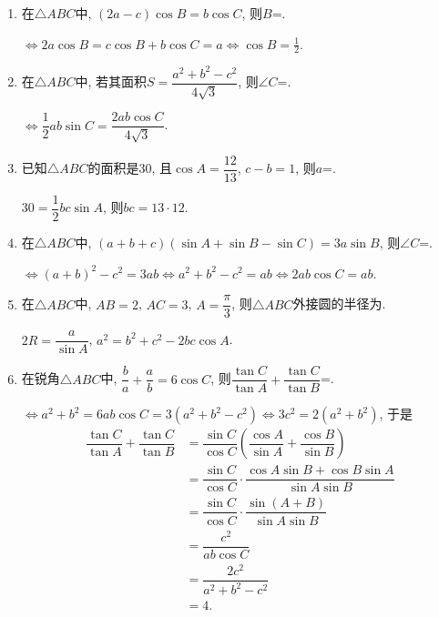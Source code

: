 \begin{enumerate}
\item 在$\triangle{ABC}$中, $(2a-c)\cos{B}=b\cos{C}$, 则$B$=. 
\begin{jieda}
$\iff 2a\cos{B}=c\cos{B}+b\cos{C}=a\iff\cos{B}=\frac{1}{2}$. 
\end{jieda}

\item 在$\triangle{ABC}$中, 若其面积$S=\dfrac{a^2+b^2-c^2}{4\sqrt 3}$, 则$\angle{C}$=. 
\begin{jieda}
$\iff \dfrac{1}{2}ab\sin{C}=\dfrac{2ab\cos{C}}{4\sqrt{3}}$. 
\end{jieda}

\item 已知$\triangle{ABC}$的面积是30, 且$\cos{A}=\dfrac{12}{13}$, $c-b=1$, 则$a$=. 
\begin{jieda}
$30=\dfrac{1}{2}bc\sin{A}$, 则$bc=13\cdot 12$. 
\end{jieda}

\item 在$\triangle{ABC}$中, $(a+b+c)(\sin{A}+\sin{B}-\sin{C})=3a\sin{B}$, 则$\angle{C}$=. 
\begin{jieda}
$\iff(a+b)^2-c^2=3ab\iff a^2+b^2-c^2=ab\iff 2ab\cos{C}=ab$. 
\end{jieda}

\item 在$\triangle{ABC}$中, $AB=2$, $AC=3$, $A=\dfrac{\pi}{3}$, 则$\triangle{ABC}$外接圆的半径为. 
\begin{jieda}
$2R=\dfrac{a}{\sin{A}}$, $a^2=b^2+c^2-2bc\cos{A}$. 
\end{jieda}

\item 在锐角$\triangle{ABC}$中, $\dfrac{b}{a}+\dfrac{a}{b}=6\cos{C}$, 则$\dfrac{\tan{C}}{\tan{A}}+\dfrac{\tan{C}}{\tan{B}}$=. 
\begin{jieda}
$\iff a^2+b^2=6ab\cos{C}=3(a^2+b^2-c^2)\iff3c^2=2(a^2+b^2)$, 
于是
\begin{align*}
\dfrac{\tan{C}}{\tan{A}}+\dfrac{\tan{C}}{\tan{B}}
& =\dfrac{\sin{C}}{\cos{C}}\left(\dfrac{\cos{A}}{\sin{A}}+\dfrac{\cos{B}}{\sin{B}}\right)\\
& =\dfrac{\sin{C}}{\cos{C}}\cdot\dfrac{\cos{A}\sin{B}+\cos{B}\sin{A}}{\sin{A}\sin{B}}\\
& =\dfrac{\sin{C}}{\cos{C}}\cdot\dfrac{\sin(A+B)}{\sin{A}\sin{B}}\\
& =\dfrac{c^2}{ab\cos{C}}\\
& =\dfrac{2c^2}{a^2+b^2-c^2}\\
& =4.
\end{align*}
\end{jieda}


\end{enumerate}
